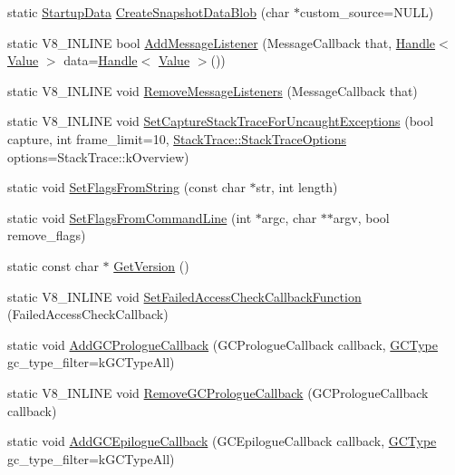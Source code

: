 \begin{DoxyCompactItemize}
\item 
static \hyperlink{classv8_1_1_startup_data}{Startup\+Data} \hyperlink{classv8_1_1_v8_a7f0bb706c6cd96b8e6dffc813cbc3296}{Create\+Snapshot\+Data\+Blob} (char $\ast$custom\+\_\+source=N\+U\+L\+L)
\item 
static V8\+\_\+\+I\+N\+L\+I\+N\+E bool \hyperlink{classv8_1_1_v8_a4e8ca19596400bd4df6a345f66daf937}{Add\+Message\+Listener} (Message\+Callback that, \hyperlink{classv8_1_1_handle}{Handle}$<$ \hyperlink{classv8_1_1_value}{Value} $>$ data=\hyperlink{classv8_1_1_handle}{Handle}$<$ \hyperlink{classv8_1_1_value}{Value} $>$())
\item 
static V8\+\_\+\+I\+N\+L\+I\+N\+E void \hyperlink{classv8_1_1_v8_a103099e00d03c714261e00d75f0d745a}{Remove\+Message\+Listeners} (Message\+Callback that)
\item 
static V8\+\_\+\+I\+N\+L\+I\+N\+E void \hyperlink{classv8_1_1_v8_a6ed3c6cd32b8d225013445b145381d34}{Set\+Capture\+Stack\+Trace\+For\+Uncaught\+Exceptions} (bool capture, int frame\+\_\+limit=10, \hyperlink{classv8_1_1_stack_trace_a9704e4a37949eb8eb8ccddbddf161492}{Stack\+Trace\+::\+Stack\+Trace\+Options} options=Stack\+Trace\+::k\+Overview)
\item 
static void \hyperlink{classv8_1_1_v8_ab263a85e6f97ea79d944bd20bb09a95f}{Set\+Flags\+From\+String} (const char $\ast$str, int length)
\item 
static void \hyperlink{classv8_1_1_v8_a63157ad9284ffad1c0ab62b21aadd08c}{Set\+Flags\+From\+Command\+Line} (int $\ast$argc, char $\ast$$\ast$argv, bool remove\+\_\+flags)
\item 
static const char $\ast$ \hyperlink{classv8_1_1_v8_afcecc0e9e8b5fa17a06a93f7b5a7538d}{Get\+Version} ()
\item 
static V8\+\_\+\+I\+N\+L\+I\+N\+E void \hyperlink{classv8_1_1_v8_affcb65e1fdf849fadc6302655b981bbc}{Set\+Failed\+Access\+Check\+Callback\+Function} (Failed\+Access\+Check\+Callback)
\item 
static void \hyperlink{classv8_1_1_v8_a49c016f17c67f700387f801b2b29b5ab}{Add\+G\+C\+Prologue\+Callback} (G\+C\+Prologue\+Callback callback, \hyperlink{namespacev8_ac109d6f27e0c0f9ef4e98bcf7a806cf2}{G\+C\+Type} gc\+\_\+type\+\_\+filter=k\+G\+C\+Type\+All)
\item 
static V8\+\_\+\+I\+N\+L\+I\+N\+E void \hyperlink{classv8_1_1_v8_ae2b102e4db324cf06a92fd9acdd6b112}{Remove\+G\+C\+Prologue\+Callback} (G\+C\+Prologue\+Callback callback)
\item 
static void \hyperlink{classv8_1_1_v8_a37aadf3536c772eb5bbf67fa7822679a}{Add\+G\+C\+Epilogue\+Callback} (G\+C\+Epilogue\+Callback callback, \hyperlink{namespacev8_ac109d6f27e0c0f9ef4e98bcf7a806cf2}{G\+C\+Type} gc\+\_\+type\+\_\+filter=k\+G\+C\+Type\+All)
$$
\end{DoxyCompactItemize}
